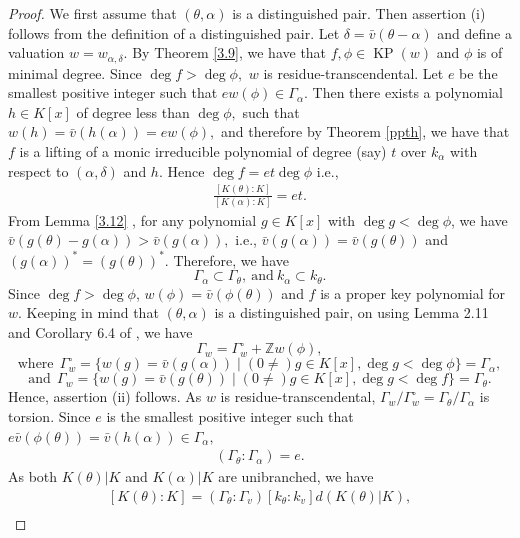 \documentclass[11pt]{amsart}
\theoremstyle{definition}
\theoremstyle{remark}
\numberwithin{equation}{section}
\begin{document}
	\begin{proof}
	We first assume that $(\theta,\alpha)$ is a distinguished pair. Then assertion (i) follows from the definition of a distinguished pair. Let $\delta=\bar{v}(\theta-\alpha)$ and define a valuation $w=w_{\alpha,\delta}.$ By Theorem \ref{3.9}, we have that $f,\phi\in \operatorname{KP}(w)$ and $\phi$ is of minimal degree.
	Since $\deg f>\deg \phi,$ $w$ is residue-transcendental. Let $e$ be the smallest positive integer such that $ew(\phi)\in \Gamma_{\alpha}.$ Then there exists a polynomial $h \in K[x]$ of  degree less than $\deg \phi,$ such that $w(h)=\bar{v}(h(\alpha))=ew(\phi),$ and therefore by Theorem \ref{ppth}, we have that $f$ is a lifting of a monic irreducible polynomial of degree (say) $t$ over $k_\alpha$ with respect to $(\alpha,\delta)$ and $h.$ Hence $\deg f= et\deg \phi$ i.e.,
	\begin{align}\label{dpeq2}
		 \frac{[K(\theta):K]}{[K(\alpha):K]}=et.
	\end{align} From  Lemma \ref{3.12} , for any polynomial $g\in K[x]$ with $\deg g<\deg \phi$, we have $\bar{v}(g(\theta)-g(\alpha))>\bar{v}(g(\alpha)),$ i.e., $\bar{v}(g(\alpha))= \bar{v}(g(\theta))$ and $(g(\alpha))^*=(g(\theta))^*.$ Therefore, we have \[\Gamma_\alpha \subset \Gamma_\theta, \ \text {and} \ k_\alpha\subset k_\theta.\]Since $\deg f>\deg \phi$, $w(\phi)=\bar{v}(\phi(\theta))$ and $f$ is a proper key polynomial for $w.$ Keeping in mind that $(\theta,\alpha)$ is a distinguished pair, on using Lemma 2.11 and Corollary 6.4 of \cite{EN4}, we have
	\[\Gamma_w=\Gamma^\circ_w+\mathbb{Z}w(\phi),\] 
	\[\text{where}\ \ \Gamma^\circ_w=\{w(g)=\bar{v}(g(\alpha))\mid (0\neq) g\in K[x], \deg g <\deg \phi\}= \Gamma_\alpha,\] 
	\[\text{and}\ \ \Gamma_w=\{w(g)=\bar{v}(g(\theta))\mid (0\neq) g\in K[x], \deg g<\deg f\}= \Gamma_\theta.\]
  Hence, assertion (ii)  follows.
	 As $w$ is residue-transcendental, $\Gamma_w/\Gamma^\circ_w=\Gamma_\theta/\Gamma_\alpha$ is torsion. Since $e$ is the smallest positive integer such that 
	$e\bar{v}(\phi(\theta))=\bar{v}(h(\alpha))\in \Gamma_\alpha,$ \begin{align}\label{dpeq3}
	(\Gamma_\theta:\Gamma_\alpha)=e.	
	\end{align}
 As both $K(\theta)|K$ and $K(\alpha)|K$ are unibranched, we have
	\begin{align}\label{dpeq4}
	[K(\theta):K]=(\Gamma_\theta:\Gamma_v)[k_\theta:k_v]d(K(\theta)|K),	
	\end{align}
	\begin{align}\label{dpeq5}

\end{align}
\end{proof}
\end{document}
